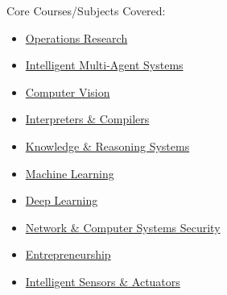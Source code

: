 \documentclass[10pt,a4paper,academicons]{altacv}
\begin{document}
\divider

\clearpage


{\small\faBook\hspace{0.5em}Core Courses/Subjects Covered:\begin{itemize}

\item \hspace{0.5em} \href{https://en.wikipedia.org/wiki/Operations_research}{Operations Research}
\item \hspace{0.5em} \href{https://en.wikipedia.org/wiki/Multi-agent_system}{Intelligent Multi-Agent Systems}
\item \hspace{0.5em} \href{https://en.wikipedia.org/wiki/Computer_vision}{Computer Vision}
\item \hspace{0.5em} \href{https://en.wikipedia.org/wiki/Compiler}{Interpreters \& Compilers}
\item \hspace{0.5em} \href{https://en.wikipedia.org/wiki/Knowledge_representation_and_reasoning}{Knowledge \& Reasoning Systems}
\item \hspace{0.5em} \href{https://en.wikipedia.org/wiki/Machine_learning}{Machine Learning}
\item \hspace{0.5em} \href{https://en.wikipedia.org/wiki/Deep_learning}{Deep Learning}
\item \hspace{0.5em} \href{https://en.wikipedia.org/wiki/Computer_security}{Network \& Computer Systems Security}
\item \hspace{0.5em} \href{https://en.wikipedia.org/wiki/Entrepreneurship}{Entrepreneurship}
\item \hspace{0.5em} \href{https://en.wikipedia.org/wiki/Intelligent_sensor}{Intelligent Sensors \& Actuators}

\end{itemize}}
\end{document}
